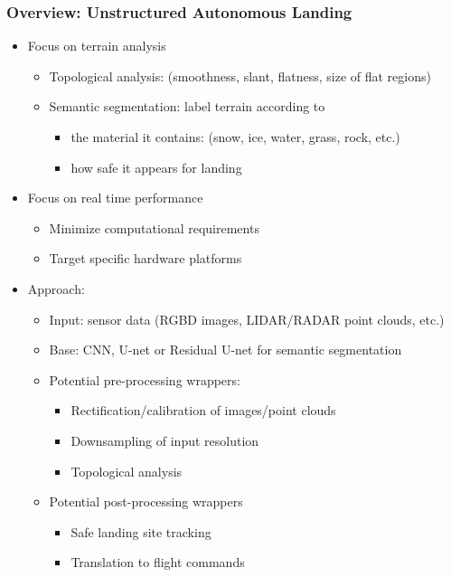 \documentclass[aspectratio=169]{rubeamer}
\newif\ifpause
\newcommand{\mypause}{\ifpause \pause \fi}
\begin{document}
\begin{frame}
  \frametitle{Overview: Unstructured Autonomous Landing}
  \begin{itemize}
    \mypause
    \item Focus on terrain analysis
    \begin{itemize}
      \mypause
      \item Topological analysis\mypause: (smoothness, slant, flatness, size of flat regions)
      \mypause
      \item Semantic segmentation\mypause: label terrain according to
      \begin{itemize}
        \item the material it contains\mypause: (snow, ice, water, grass, rock, etc.)
        \mypause
        \item how safe it appears for landing
      \end{itemize}
    \end{itemize}
    \mypause
    \item Focus on real time performance
    \begin{itemize}
      \mypause
      \item Minimize computational requirements
      \mypause
      \item Target specific hardware platforms
    \end{itemize}
    \mypause
    \item Approach:
    \begin{itemize}
      \item Input: sensor data (RGBD images, LIDAR/RADAR point clouds, etc.)
      \mypause
      \item Base: CNN, U-net or Residual U-net for semantic segmentation
      \mypause
      \item Potential pre-processing wrappers:
      \begin{itemize}
        \item Rectification/calibration of images/point clouds
        \mypause
        \item Downsampling of input resolution
        \mypause
        \item Topological analysis
      \end{itemize}
      \mypause
      \item Potential post-processing wrappers
      \begin{itemize}
        \item Safe landing site tracking
        \mypause
        \item Translation to flight commands
      \end{itemize}
    \end{itemize}
  \end{itemize}
\end{frame}
\end{document}
